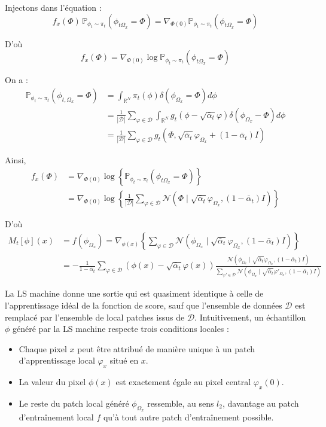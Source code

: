 \documentclass[a4paper,10pt]{article}
\theoremstyle{definition} %
\theoremstyle{definition} %
\theoremstyle{definition} %
\theoremstyle{definition} %
\begin{document}
Injectons dans l'équation :
\[ f_x(\Phi)\, \mathbb{P}_{\phi_t \sim \pi_t} (\phi_{t \Omega_x} = \Phi) = \nabla_{\Phi(0)} \mathbb{P}_{\phi_t \sim \pi_t} (\phi_{t \Omega_x} = \Phi) \]

D'où
\[ f_x(\Phi) = \nabla_{\Phi(0)} \log \mathbb{P}_{\phi_t \sim \pi_t} (\phi_{t\Omega_x} = \Phi) \]

On a :
\begin{align*}
\mathbb{P}_{\phi_t \sim \pi_t} (\phi_{t, \Omega_x} = \Phi) &= \int_{\mathbb{R}^N} \pi_t(\phi) \delta(\phi_{\Omega_x} = \Phi) d\phi \\
&= \frac{1}{|\mathcal{D}|} \sum\limits_{\varphi \in \mathcal{D}} \int_{\mathbb{R}^N} g_t(\phi - \sqrt{\bar \alpha_t} \varphi) \delta(\phi_{\Omega_x} - \Phi) d\phi \\
&= \frac{1}{|\mathcal{D}|} \sum\limits_{\varphi \in \mathcal{D}} g_t(\Phi, \sqrt{\bar \alpha_t} \varphi_{\Omega_x} + (1 - \bar \alpha_t) I)
\end{align*}

Ainsi,
\begin{align*}
    f_x(\Phi) &= \nabla_{\Phi(0)} \log \left\{\mathbb{P}_{\phi_t \sim \pi_t} (\phi_{t\Omega_x} = \Phi)\right\} \\
    &=\nabla_{\Phi(0)} \log \left\{ \frac{1}{|\mathcal{D}|} \sum\limits_{\varphi \in \mathcal{D}} \mathcal{N}(\Phi \mid \sqrt{\bar \alpha_t} \varphi_{\Omega_x}, (1 - \bar\alpha_t) I) \right\}
\end{align*}

D'où
\begin{align*}
M_t[\phi](x) &= f(\phi_{\Omega_x}) = \nabla_{\phi(x)} \left\{ \sum\limits_{\varphi \in \mathcal{D}} \mathcal{N}(\phi_{\Omega_x} \mid \sqrt{\bar \alpha_t} \varphi_{\Omega_x}, (1 - \bar \alpha_t) I) \right\} \\
&= -\frac{1}{1 - \bar \alpha_t} \sum\limits_{\varphi \in \mathcal{D}} \left(\phi(x) - \sqrt{\bar \alpha_t} \varphi(x)\right) \frac{\mathcal{N}(\phi_{\Omega_x} \mid \sqrt{\bar \alpha_t} \varphi_{\Omega_x}, (1 - \bar \alpha_t) I)}{\sum\limits_{\varphi' \in \mathcal{D}} \mathcal{N}(\phi_{\Omega_x} \mid \sqrt{\bar \alpha_t} \varphi'_{\Omega_x}, (1 - \bar \alpha_t) I)}
\end{align*} 

La LS machine donne une sortie qui est quasiment identique à celle de l'apprentissage idéal de la fonction de score, sauf que l'ensemble de données $\mathcal{D}$ est remplacé par l'ensemble de local patches issus de $\mathcal{D}$. Intuitivement, un échantillon $\phi$ généré par la LS machine respecte trois conditions locales :
\begin{itemize}[topsep=-5pt]
    \item Chaque pixel $x$ peut être attribué de manière unique à un patch d'apprentissage local $\varphi_x$ situé en $x$.
    \item La valeur du pixel $\phi(x)$ est exactement égale au pixel central $\varphi_x(0)$.
    \item Le reste du patch local généré $\phi_{\Omega_x}$ ressemble, au sens $l_2$, davantage au patch d'entraînement local $f$ qu'à tout autre patch d'entraînement possible.
\end{itemize}
\end{document}
